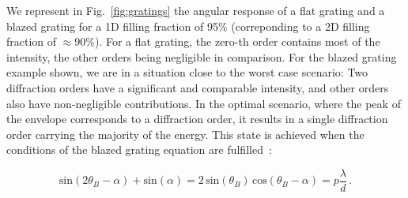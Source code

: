 \documentclass[12pt]{iopart}
\begin{document}
We represent in Fig.~\ref{fig:gratings} the angular response of a flat grating and a blazed grating
for a 1D filling fraction of 95\% (correponding to a 2D filling fraction of $\approx 90$\%).
For a flat grating, the zero-th order contains most of the intensity,
the other orders being negligible in comparison.
For the blazed grating example shown,
we are in a situation close to the worst case scenario:
Two diffraction orders have a significant and comparable intensity,
and other orders also have non-negligible contributions.
In the optimal scenario, where the peak of the envelope corresponds to a diffraction order,
it results in a single diffraction order carrying the majority of the energy.
This state is achieved when the conditions of the blazed grating equation are fulfilled~\cite{Casini2014on}:



\begin{equation}
  \text{sin}(2\theta_B-\alpha) + \text{sin}(\alpha)
  = 2 \,\text{sin}(\theta_B)  \,\text{cos}(\theta_B-\alpha)
  = p\frac{\lambda}{d} \, .
  \label{eq:blazed_eq}
\end{equation}
\end{document}
